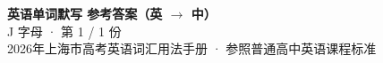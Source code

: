 \documentclass[10pt,a4paper]{article}
\begin{document}
\pagestyle{plain}

\begin{center}
{\LARGE\bfseries 英语单词默写 \quad 参考答案（英 $\to$ 中）}\\[0.22em]
{\large J 字母 · 第 1 / 1 份}\\[0.18em]
{\small 2026年上海市高考英语词汇用法手册 · 参照普通高中英语课程标准}
\end{center}

\vspace{0.2em}
\noindent{\color{rulegray}\rule{\textwidth}{0.8pt}}

\vspace{0.35em}

\vspace{0.25em}
\renewcommand{\arraystretch}{1.32}
\end{document}
